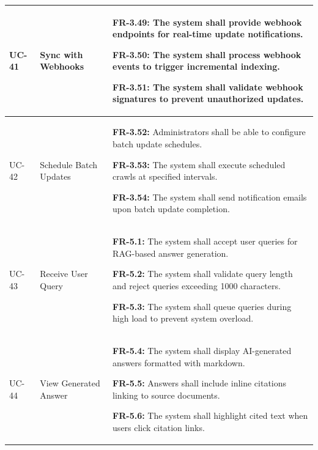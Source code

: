 \begin{longtable}{|>{\raggedright\arraybackslash}p{}|>{\raggedright\arraybackslash}p{}|>{\raggedright\arraybackslash}p{}|}
UC-41 & Sync with Webhooks &
\begin{frequirements}
\item \textbf{FR-3.49:} The system shall provide webhook endpoints for real-time update notifications.
\item \textbf{FR-3.50:} The system shall process webhook events to trigger incremental indexing.
\item \textbf{FR-3.51:} The system shall validate webhook signatures to prevent unauthorized updates.
\end{frequirements} \\
\hline

UC-42 & Schedule Batch Updates &
\begin{frequirements}
\item \textbf{FR-3.52:} Administrators shall be able to configure batch update schedules.
\item \textbf{FR-3.53:} The system shall execute scheduled crawls at specified intervals.
\item \textbf{FR-3.54:} The system shall send notification emails upon batch update completion.
\end{frequirements} \\
\hline

UC-43 & Receive User Query &
\begin{frequirements}
\item \textbf{FR-5.1:} The system shall accept user queries for RAG-based answer generation.
\item \textbf{FR-5.2:} The system shall validate query length and reject queries exceeding 1000 characters.
\item \textbf{FR-5.3:} The system shall queue queries during high load to prevent system overload.
\end{frequirements} \\
\hline

UC-44 & View Generated Answer &
\begin{frequirements}
\item \textbf{FR-5.4:} The system shall display AI-generated answers formatted with markdown.
\item \textbf{FR-5.5:} Answers shall include inline citations linking to source documents.
\item \textbf{FR-5.6:} The system shall highlight cited text when users click citation links.
\end{frequirements} \\
\hline


\end{longtable}
